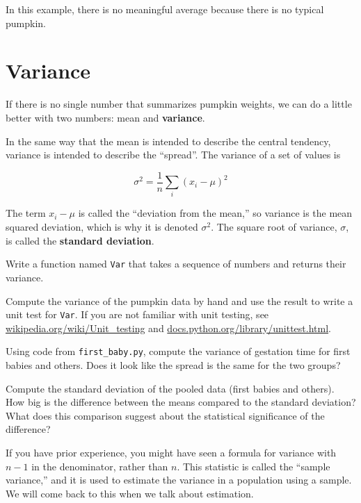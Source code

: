 \documentclass[10pt]{book}
\begin{document}
In this example, there is no meaningful average because
there is no typical pumpkin.

\section{Variance}

If there is no single number that summarizes pumpkin weights,
we can do a little better with two numbers: mean and {\bf variance}.

In the same way that the mean is intended to describe the central
tendency, variance is intended to describe the ``spread''.
The variance of a set of values is

\[ \sigma^2 = \frac{1}{n} \sum_i (x_i - \mu)^2 \]

The term $x_i - \mu$ is called the ``deviation from the mean,'' so
variance is the mean squared deviation, which is why it is denoted
$\sigma^2$.  The square root of variance, $\sigma$, is called the {\bf
  standard deviation}.

\begin{ex}
Write a function named {\tt Var} that takes a sequence 
of numbers and returns their variance.

Compute the variance of the pumpkin data by hand and use the result
to write a unit test for {\tt Var}.  If you are not familiar with unit
testing, see \url{wikipedia.org/wiki/Unit_testing} and
\url{docs.python.org/library/unittest.html}.
\end{ex}

\begin{ex}
Using code from \verb"first_baby.py", compute the variance
of gestation time for first babies and others.  Does it look
like the spread is the same for the two groups?
\end{ex}

\begin{ex}
Compute the standard deviation of the pooled data (first babies
and others).  How big is the difference between the
means compared to the standard deviation?  What does this comparison
suggest about the statistical significance of the difference?
\end{ex}

If you have prior experience, you might have seen a 
formula for variance with $n-1$ in the denominator, rather than $n$.
This statistic is called the ``sample variance,'' and it is used
to estimate the variance in a population using a sample.  We will
come back to this when we talk about estimation.
\end{document}
